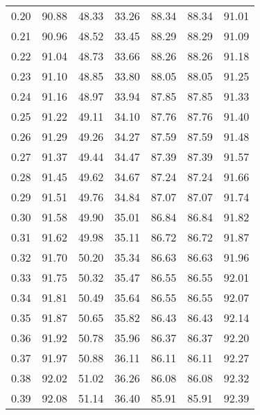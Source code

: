 \begin{tabular}{|c|c|c|c|c|c|c|}
      0.20 &     90.88 &     48.33 &      33.26 &   88.34 &      88.34 &         91.01 \\
      0.21 &     90.96 &     48.52 &      33.45 &   88.29 &      88.29 &         91.09 \\
      0.22 &     91.04 &     48.73 &      33.66 &   88.26 &      88.26 &         91.18 \\
      0.23 &     91.10 &     48.85 &      33.80 &   88.05 &      88.05 &         91.25 \\
      0.24 &     91.16 &     48.97 &      33.94 &   87.85 &      87.85 &         91.33 \\
      0.25 &     91.22 &     49.11 &      34.10 &   87.76 &      87.76 &         91.40 \\
      0.26 &     91.29 &     49.26 &      34.27 &   87.59 &      87.59 &         91.48 \\
      0.27 &     91.37 &     49.44 &      34.47 &   87.39 &      87.39 &         91.57 \\
      0.28 &     91.45 &     49.62 &      34.67 &   87.24 &      87.24 &         91.66 \\
      0.29 &     91.51 &     49.76 &      34.84 &   87.07 &      87.07 &         91.74 \\
      0.30 &     91.58 &     49.90 &      35.01 &   86.84 &      86.84 &         91.82 \\
      0.31 &     91.62 &     49.98 &      35.11 &   86.72 &      86.72 &         91.87 \\
      0.32 &     91.70 &     50.20 &      35.34 &   86.63 &      86.63 &         91.96 \\
      0.33 &     91.75 &     50.32 &      35.47 &   86.55 &      86.55 &         92.01 \\
      0.34 &     91.81 &     50.49 &      35.64 &   86.55 &      86.55 &         92.07 \\
      0.35 &     91.87 &     50.65 &      35.82 &   86.43 &      86.43 &         92.14 \\
      0.36 &     91.92 &     50.78 &      35.96 &   86.37 &      86.37 &         92.20 \\
      0.37 &     91.97 &     50.88 &      36.11 &   86.11 &      86.11 &         92.27 \\
      0.38 &     92.02 &     51.02 &      36.26 &   86.08 &      86.08 &         92.32 \\
      0.39 &     92.08 &     51.14 &      36.40 &   85.91 &      85.91 &         92.39 \\

\end{tabular}

